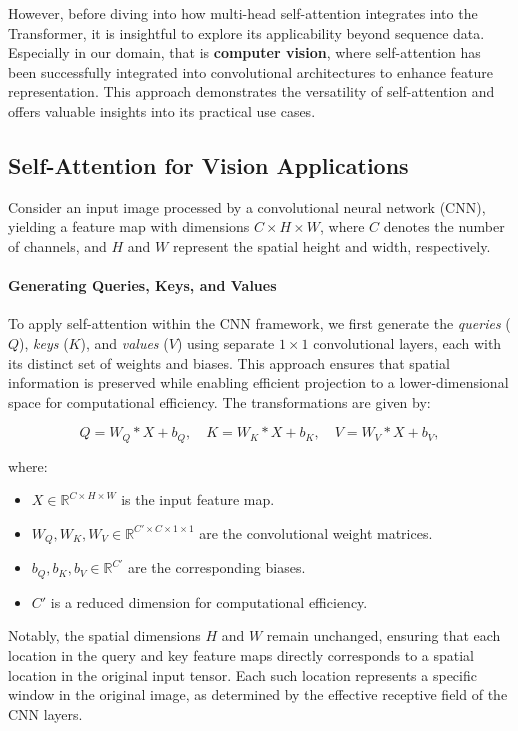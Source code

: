 \noindent However, before diving into how multi-head self-attention integrates into the Transformer, it is insightful to explore its applicability beyond sequence data. Especially in our domain, that is \textbf{computer vision}, where self-attention has been successfully integrated into convolutional architectures to enhance feature representation. This approach demonstrates the versatility of self-attention and offers valuable insights into its practical use cases.

\subsection{Self-Attention for Vision Applications}

\noindent Consider an input image processed by a convolutional neural network (CNN), yielding a feature map with dimensions \( C \times H \times W \), where \( C \) denotes the number of channels, and \( H \) and \( W \) represent the spatial height and width, respectively.

\paragraph{Generating Queries, Keys, and Values}

\noindent To apply self-attention within the CNN framework, we first generate the \emph{queries} (\(Q\)), \emph{keys} (\(K\)), and \emph{values} (\(V\)) using separate \(1 \times 1\) convolutional layers, each with its distinct set of weights and biases. This approach ensures that spatial information is preserved while enabling efficient projection to a lower-dimensional space for computational efficiency. The transformations are given by:

\[
Q = W_Q * X + b_Q, \quad K = W_K * X + b_K, \quad V = W_V * X + b_V,
\]

where:
\begin{itemize}
    \item \( X \in \mathbb{R}^{C \times H \times W} \) is the input feature map.
    \item \( W_Q, W_K, W_V \in \mathbb{R}^{C' \times C \times 1 \times 1} \) are the convolutional weight matrices.
    \item \( b_Q, b_K, b_V \in \mathbb{R}^{C'} \) are the corresponding biases.
    \item \( C' \) is a reduced dimension for computational efficiency.
\end{itemize}

\noindent Notably, the spatial dimensions \(H\) and \(W\) remain unchanged, ensuring that each location in the query and key feature maps directly corresponds to a spatial location in the original input tensor. Each such location represents a specific window in the original image, as determined by the effective receptive field of the CNN layers.


